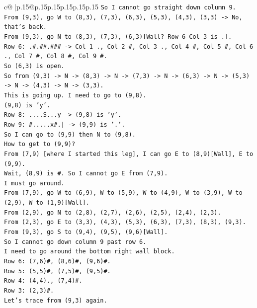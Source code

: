 \documentclass{article}
\begin{document}
{\begin{supertabular}{c@{$\;$}|p{.15\linewidth}@{}p{.15\linewidth}p{.15\linewidth}p{.15\linewidth}p{.15\linewidth}p{.15\linewidth}}
{{{\texttt{So I cannot go straight down column 9.} \\
\texttt{From (9,3), go W to (8,3), (7,3), (6,3), (5,3), (4,3), (3,3) {-}> No, that's back.} \\
\texttt{From (9,3), go N to (8,3), (7,3), (6,3){[}Wall? Row 6 Col 3 is .{]}.} \\
\texttt{Row 6: .\#.\#\#.\#\#\# {-}> Col 1 ., Col 2 \#, Col 3 ., Col 4 \#, Col 5 \#, Col 6 ., Col 7 \#, Col 8 \#, Col 9 \#.} \\
\texttt{So (6,3) is open.} \\
\texttt{So from (9,3) {-}> N {-}> (8,3) {-}> N {-}> (7,3) {-}> N {-}> (6,3) {-}> N {-}> (5,3) {-}> N {-}> (4,3) {-}> N {-}> (3,3).} \\
\texttt{This is going up. I need to go to (9,8).} \\
\texttt{(9,8) is 'y'.} \\
\texttt{Row 8: ....S...y {-}> (9,8) is 'y'.} \\
\texttt{Row 9: \#.....x\#.| {-}> (9,9) is '.'.} \\
\texttt{So I can go to (9,9) then N to (9,8).} \\
\texttt{How to get to (9,9)?} \\
\texttt{From (7,9) {[}where I started this leg{]}, I can go E to (8,9){[}Wall{]}, E to (9,9).} \\
\texttt{Wait, (8,9) is \#. So I cannot go E from (7,9).} \\
\texttt{I must go around.} \\
\texttt{From (7,9), go W to (6,9), W to (5,9), W to (4,9), W to (3,9), W to (2,9), W to (1,9){[}Wall{]}.} \\
\texttt{From (2,9), go N to (2,8), (2,7), (2,6), (2,5), (2,4), (2,3).} \\
\texttt{From (2,3), go E to (3,3), (4,3), (5,3), (6,3), (7,3), (8,3), (9,3).} \\
\texttt{From (9,3), go S to (9,4), (9,5), (9,6){[}Wall{]}.} \\
\texttt{So I cannot go down column 9 past row 6.} \\
\texttt{I need to go around the bottom right wall block.} \\
\texttt{Row 6: (7,6)\#, (8,6)\#, (9,6)\#.} \\
\texttt{Row 5: (5,5)\#, (7,5)\#, (9,5)\#.} \\
\texttt{Row 4: (4,4)., (7,4)\#.} \\
\texttt{Row 3: (2,3)\#.} \\
\texttt{Let's trace from (9,3) again.} \\
}}}
\end{supertabular}}
\end{document}

